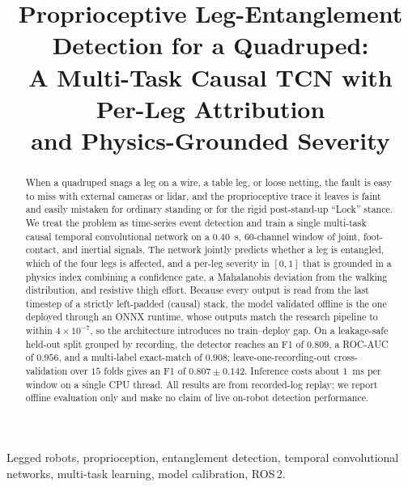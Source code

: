 \documentclass[conference]{IEEEtran}
\begin{document}
\title{Proprioceptive Leg-Entanglement Detection for a Quadruped:\\
A Multi-Task Causal TCN with Per-Leg Attribution\\ and Physics-Grounded Severity}

\author{
}

\maketitle

\begin{abstract}
When a quadruped snags a leg on a wire, a table leg, or loose netting, the fault is easy to miss with external cameras or lidar, and the proprioceptive trace it leaves is faint and easily mistaken for ordinary standing or for the rigid post-stand-up ``Lock'' stance. We treat the problem as time-series event detection and train a single multi-task causal temporal convolutional network on a $0.40$~s, $60$-channel window of joint, foot-contact, and inertial signals. The network jointly predicts whether a leg is entangled, which of the four legs is affected, and a per-leg severity in $[0,1]$ that is grounded in a physics index combining a confidence gate, a Mahalanobis deviation from the walking distribution, and resistive thigh effort. Because every output is read from the last timestep of a strictly left-padded (causal) stack, the model validated offline is the one deployed through an ONNX runtime, whose outputs match the research pipeline to within $4\times10^{-7}$, so the architecture introduces no train--deploy gap. On a leakage-safe held-out split grouped by recording, the detector reaches an F1 of $0.809$, a ROC-AUC of $0.956$, and a multi-label exact-match of $0.908$; leave-one-recording-out cross-validation over $15$ folds gives an F1 of $0.807 \pm 0.142$. Inference costs about $1$~ms per window on a single CPU thread. All results are from recorded-log replay; we report offline evaluation only and make no claim of live on-robot detection performance.
\end{abstract}

\begin{IEEEkeywords}
Legged robots, proprioception, entanglement detection, temporal convolutional networks,
multi-task learning, model calibration, ROS\,2.
\end{IEEEkeywords}
\end{document}
